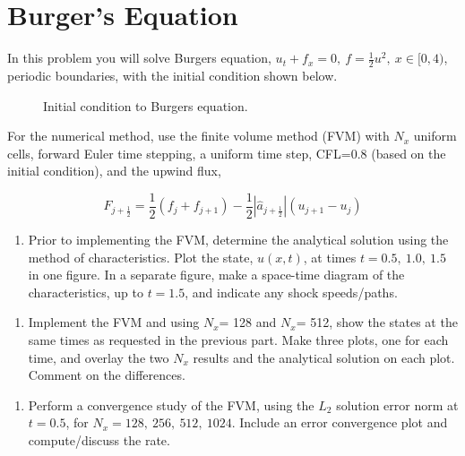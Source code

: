 \section{Burger's Equation}
In this problem you will solve Burgers equation, $u_t+f_x= 0,\ f=\frac{1}{2}u^2,\ x \in [0,4)$, periodic boundaries, with the initial condition shown below.

\begin{figure}[h]
    \centering
    
    \caption{Initial condition to Burgers equation.}
\end{figure}

For the numerical method, use the finite volume method (FVM) with $N_x$ uniform cells, forward Euler time stepping, a uniform time step, CFL=0.8 (based on the initial condition), and the upwind flux,

\begin{equation*}
    \hat{F}_{j + \frac{1}{2}} = \frac{1}{2}\left(f_j + f_{j+1}\right) - \frac{1}{2}|\hat{a}_{j + \frac{1}{2}}|\left(u_{j+1} - u_j\right)
\end{equation*}

\begin{enumerate}[label=\alph*., start = 1]
    \item Prior to implementing the FVM, determine the analytical solution using the method of characteristics. Plot the state, $u(x,t)$, at times $t= 0.5,\ 1.0,\ 1.5$ in one figure. In a separate figure, make a space-time diagram of the characteristics, up to $t= 1.5$, and indicate any shock speeds/paths.

\end{enumerate}
    
\begin{enumerate}[label=\alph*., start = 2]
    \item Implement the FVM and using $N_x$= 128 and $N_x$= 512, show the states at the same times as requested in the previous part. Make three plots, one for each time, and overlay the two $N_x$ results and the analytical solution on each plot. Comment on the differences.
\end{enumerate}
    
\begin{enumerate}[label=\alph*., start = 3]
    \item Perform a convergence study of the FVM, using the $L_2$ solution error norm at $t = 0.5$, for $N_x= 128,\ 256,\ 512,\ 1024.$  Include an error convergence plot and compute/discuss the rate.
\end{enumerate}
